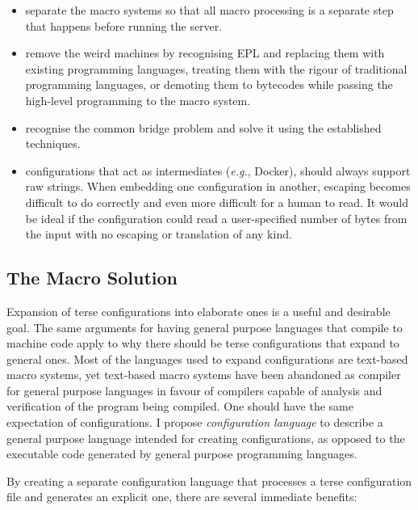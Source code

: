 \documentclass[letterpaper,twocolumn,10pt]{article}
\begin{document}
\begin{itemize}
\item separate the macro systems so that all macro processing is a separate step that happens before running the server.
\item remove the weird machines by recognising EPL and replacing them with existing programming languages, treating them with the rigour of traditional programming languages, or demoting them to bytecodes while passing the high-level programming to the macro system.
\item recognise the common bridge problem and solve it using the established techniques.
\item configurations that act as intermediates (\emph{e.g.}, Docker), should always support raw strings. When embedding one configuration in another, escaping becomes difficult to do correctly and even more difficult for a human to read. It would be ideal if the configuration could read a user-specified number of bytes from the input with no escaping or translation of any kind.
\end{itemize}

\subsection{The Macro Solution}
Expansion of terse configurations into elaborate ones is a useful and desirable goal. The same arguments for having general purpose languages that compile to machine code apply to why there should be terse configurations that expand to general ones. Most of the languages used to expand configurations are text-based macro systems, yet text-based macro systems have been abandoned as compiler for general purpose languages in favour of compilers capable of analysis and verification of the program being compiled. One should have the same expectation of configurations. I propose \emph{configuration language} to describe a general purpose language intended for creating configurations, as opposed to the executable code generated by general purpose programming languages.

By creating a separate configuration language that processes a terse configuration file and generates an explicit one, there are several immediate benefits:
\end{document}
